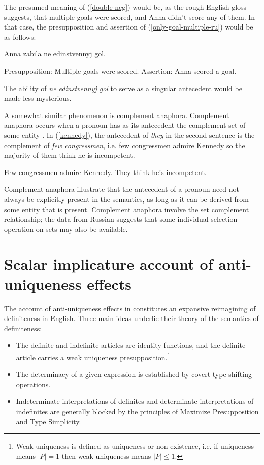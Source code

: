 \documentclass{article}
\begin{document}
The presumed meaning of (\ref{double-neg}) would be, as the rough English gloss suggests, that multiple goals were scored, and Anna didn't score any of them. In that case, the presupposition and assertion of (\ref{only-goal-multiple-ru}) would be as follows:

\begin{exe}
	\ex Anna zabila ne edinstvennyj gol. \begin{xlist}
		\ex Presupposition: Multiple goals were scored.
		\ex Assertion: Anna scored a goal.
	\end{xlist}
\end{exe}

The ability of \textit{ne edinstvennyj gol} to serve as a singular antecedent would be made less mysterious. %

A somewhat similar phenomenon is complement anaphora. Complement anaphora occurs when a pronoun has as its antecedent the complement set of some entity \citep{nouwen03, schwarz09}. In (\ref{kennedy}), the antecedent of \textit{they} in the second sentence is the complement of \textit{few congressmen}, i.e. few congressmen admire Kennedy so the majority of them think he is incompetent.

\begin{exe}
	\ex \label{kennedy} Few congressmen admire Kennedy. They think he's incompetent.
\end{exe}

Complement anaphora illustrate that the antecedent of a pronoun need not always be explicitly present in the semantics, as long as it can be derived from some entity that is present. Complement anaphora involve the set complement relationship; the data from Russian suggests that some individual-selection operation on sets may also be available.


\section{Scalar implicature account of anti-uniqueness effects \label{sec:scalar}}
The account of anti-uniqueness effects in \citet{cb2015, cb2012a} constitutes an expansive reimagining of definiteness in English. Three main ideas underlie their theory of the semantics of definiteness:

\begin{itemize}
	\item The definite and indefinite articles are identity functions, and the definite article carries a weak uniqueness presupposition.\footnote{Weak uniqueness is defined as uniqueness or non-existence, i.e. if uniqueness means $|P| = 1$ then weak uniqueness means $|P| \le 1$.}
	\item The determinacy of a given expression is established by covert type-shifting operations.
	\item Indeterminate interpretations of definites and determinate interpretations of indefinites are generally blocked by the principles of Maximize Presupposition and Type Simplicity.
\end{itemize}
\end{document}
